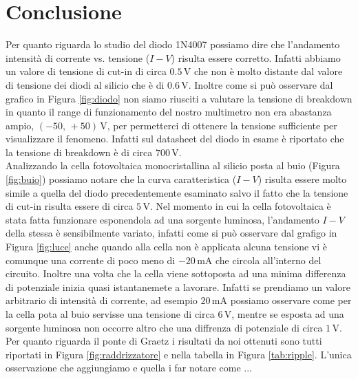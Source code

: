\section*{Conclusione}

Per quanto riguarda lo studio del diodo 1N4007 possiamo dire che l'andamento intensità di corrente vs. tensione ($I-V$) risulta essere corretto. Infatti abbiamo un valore di tensione di cut-in di circa $0.5\,\si{\volt}$ che non è molto distante dal valore di tensione dei diodi al silicio che è di $0.6\,\si{\volt}$.
Inoltre come si può osservare dal grafico in Figura \ref{fig:diodo} non siamo riusciti a valutare la tensione di breakdown in quanto il range di funzionamento del nostro multimetro non era abastanza ampio, $(-50,\,+50)\,\si{\volt}$, per permetterci di ottenere la tensione sufficiente per visualizzare il fenomeno. Infatti sul datasheet del diodo in esame è riportato che la tensione di breakdown è di circa $700\,\si{\volt}$.\\

Analizzando la cella fotovoltaica monocristallina al silicio posta al buio (Figura \ref{fig:buio}) possiamo notare che la curva caratteristica ($I-V$) risulta essere molto simile a quella del diodo precedentemente esaminato salvo il fatto che la tensione di cut-in risulta essere di circa $5\,\si{\volt}$.
Nel momento in cui la cella fotovoltaica è stata fatta funzionare esponendola ad una sorgente luminosa, l'andamento $I-V$ della stessa è sensibilmente variato, infatti come si può osservare dal grafigo in Figura \ref{fig:luce} anche quando alla cella non è applicata alcuna tensione vi è comunque una corrente di poco meno di $-20\,\si{\milli\ampere}$ che circola all'interno del circuito.
Inoltre una volta che la cella viene sottoposta ad una minima differenza di potenziale inizia quasi istantanemete a lavorare. Infatti se prendiamo un valore arbitrario di intensità di corrente, ad esempio $20\,\si{\milli\ampere}$ possiamo osservare come per la cella pota al buio servisse una tensione di circa $6\,\si{\volt}$, mentre se esposta ad una sorgente luminosa non occorre altro che una diffrenza di potenziale di circa $1\,\si{\volt}$.\\

Per quanto riguarda il ponte di Graetz i risultati da noi ottenuti sono tutti riportati in Figura \ref{fig:raddrizzatore} e nella tabella in Figura \ref{tab:ripple}. L'unica osservazione che aggiungiamo e quella i far notare come ...